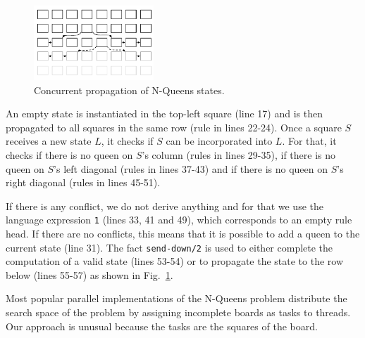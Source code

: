 \begin{figure}[ht]
\includegraphics[width=0.4\textwidth]{figures/coordination/nqueens.pdf}
\caption{Concurrent propagation of N-Queens states.}
\label{coordination:fig:nqueens}
\end{figure}

An empty state is instantiated in the top-left square (line 17) and is
then propagated to all squares in the same row (rule in lines
22-24). Once a square $S$ receives a new state $L$, it checks if $S$ can be
incorporated into $L$. For that, it checks if there is no queen on $S$'s
column (rules in lines 29-35), if there is no queen on $S$'s left
diagonal (rules in lines 37-43) and if there is no queen on $S$'s right
diagonal (rules in lines 45-51).

If there is any conflict, we do not derive anything and for that we use the
language expression \texttt{1} (lines 33, 41 and 49), which corresponds to an
empty rule head. If there are no conflicts, this means that it is possible to
add a queen to the current state (line 31). The fact \texttt{send-down/2} is
used to either complete the computation of a valid state (lines 53-54) or to
propagate the state to the row below (lines 55-57) as shown in
Fig.~\ref{coordination:fig:nqueens}.

Most popular parallel implementations of the N-Queens problem
distribute the search space of the problem by assigning incomplete
boards as tasks to threads. Our approach is unusual because the tasks
are the squares of the board.

